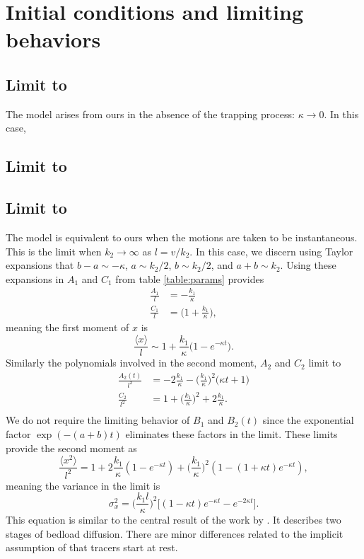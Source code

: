 \documentclass[]{agujournal2018}
\newcommand\be{\begin{equation}}
\newcommand\ee{\end{equation}}
\newcommand\bra{\langle}
\newcommand\ket{\rangle}
\begin{document}
\section{Initial conditions and limiting behaviors}
\label{sec:appendixC}
\subsection{Limit to \citet{Lisle1998}}
The \citet{Lisle1998} model arises from ours in the absence of the trapping process: $\kappa \rightarrow 0$.
In this case, 
\subsection{Limit to \citet{Einstein1937}}
\subsection{Limit to \citet{Wu2019}}
The \citet{Wu2019} model is equivalent to ours when the motions are taken to be instantaneous. This is the limit when $k_2 \rightarrow \infty$ as $l=v/k_2$.
In this case, we discern using Taylor expansions that $b-a \sim -\kappa$, $ a \sim k_2/2$, $b\sim k_2/2$, and $a+b \sim k_2$.
Using these expansions in $A_1$ and $C_1$ from table \ref{table:params} provides
\begin{align}
\frac{A_1}{l} &= -\frac{k_1}{\kappa}\\
\frac{C_1}{l} &= \big(1+\frac{k_1}{\kappa}\big),
\end{align}
meaning the first moment of $x$ is 
\be \frac{\bra x \ket}{l} \sim 1 + \frac{k_1}{\kappa}\big(1-e^{-\kappa t}\big).\ee
Similarly the polynomials involved in the second moment, $A_2$ and $C_2$ limit to 
\begin{align}
\frac{A_2(t)}{l^2} &= -2\frac{k_1}{\kappa} - \Big(\frac{k_1}{\kappa}\Big)^2\big(\kappa t+ 1\big)\\
\frac{C_2}{l^2} &=1+ \Big(\frac{k_1}{\kappa}\Big)^2 + 2\frac{k_1}{\kappa}.\\
\end{align}
We do not require the limiting behavior of $B_1$ and $B_2(t)$ since the exponential factor $\exp(-(a+b)t)$ eliminates these factors in the limit.
These limits provide the second moment as 
\be \frac{\bra x^2 \ket}{l^2} = 1 + 2 \frac{k_1}{\kappa}(1-e^{-\kappa t}) + \Big(\frac{k_1}{\kappa}\Big)^2 (1-(1+\kappa t)e^{-\kappa t}),\ee
meaning the variance in the \citet{Wu2019} limit is 
\be \sigma_x^2 = \Big(\frac{k_1 l}{\kappa}\Big)^2 \Big[(1-\kappa t)e^{-\kappa t}-e^{-2\kappa t}\Big].\label{eq:wuvar}\ee
This equation is similar to the central result of the work by \citet{Wu2019}. It describes two stages of bedload diffusion.
There are minor differences related to the implicit assumption of \citet{Wu2019} that tracers start at rest.
\end{document}
